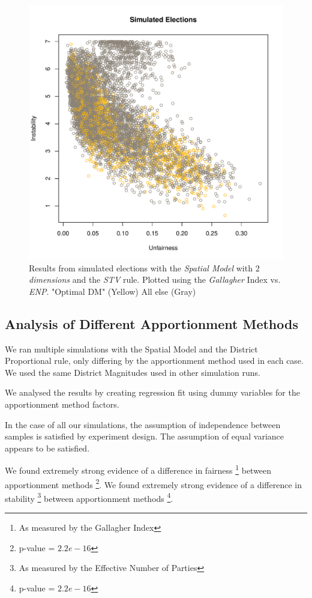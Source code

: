 \documentclass{article}
\begin{document}
\begin{figure}[]
\includegraphics[scale=1.00]{images/stv_spatial2_gallagher_enp_optimal.pdf}
\caption{Results from simulated elections with the \emph{Spatial Model} with \emph{$2$ dimensions} and the \emph{STV} rule. Plotted using the \emph{Gallagher} Index vs. \emph{ENP}. "Optimal DM" (Yellow) All else (Gray)}
\label{fig:stv_spatial2_optimal}
\end{figure}

\subsection{Analysis of Different Apportionment Methods}
\label{sec:techstats}
We ran multiple simulations with the Spatial Model and the District Proportional rule, only differing by the apportionment method used in each case. We used the same District Magnitudes used in other simulation runs.

We analysed the results by creating regression fit using dummy variables for the apportionment method factors.

In the case of all our simulations, the assumption of independence between samples is satisfied by experiment design. The assumption of equal variance appears to be satisfied. 

We found extremely strong evidence of a difference in fairness \footnote{As measured by the Gallagher Index} between apportionment methods \footnote{p-value = $2.2e-16$}. We found extremely strong evidence of a difference in stability \footnote{As measured by the Effective Number of Parties} between apportionment methods \footnote{p-value = $2.2e-16$}. 
\end{document}
